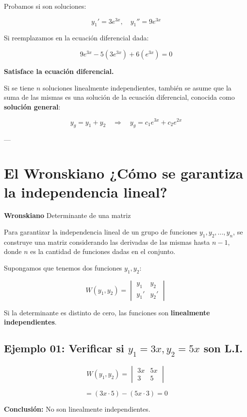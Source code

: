 Probamos si son soluciones:

\[
y_{1} ' = 3e^{3x}, \quad y_{1} '' = 9e^{3x}
\]

Si reemplazamos en la ecuación diferencial dada:

\[
9e^{3x} -5(3e^{3x}) +6(e^{3x}) =0
\]

\textbf{Satisface la ecuación diferencial.}

Si se tiene \( n \) soluciones linealmente independientes, también se asume que la suma de las mismas es una solución de la ecuación diferencial, conocida como \textbf{solución general}:

\[
y_{g} = y_{1} + y_{2} \quad \Longrightarrow \quad y_{g} = c_{1} e^{3x} + c_{2} e^{2x}
\]

---

\section{El Wronskiano ¿Cómo se garantiza la independencia lineal?}

\textbf{Wronskiano} Determinante de una matriz

Para garantizar la independencia lineal de un grupo de funciones \( y_{1}, y_{2}, ..., y_{n} \), se construye una matriz considerando las derivadas de las mismas hasta \( n-1 \), donde \( n \) es la cantidad de funciones dadas en el conjunto.

Supongamos que tenemos dos funciones \( y_{1}, y_{2} \):

\[
W(y_{1}, y_{2}) =
\begin{vmatrix}
y_{1} & y_{2}\\
y_{1} ' & y_{2} '
\end{vmatrix}
\]

Si la determinante es distinto de cero, las funciones son \textbf{linealmente independientes}.


\subsection{Ejemplo 01: Verificar si \( y_{1} = 3x, y_{2} = 5x \) son L.I.}

\[
W(y_{1}, y_{2}) =
\begin{vmatrix}
3x & 5x\\
3 & 5
\end{vmatrix}
\]

\[
= (3x \cdot 5) - (5x \cdot 3) = 0
\]

\textbf{Conclusión:} No son linealmente independientes.

